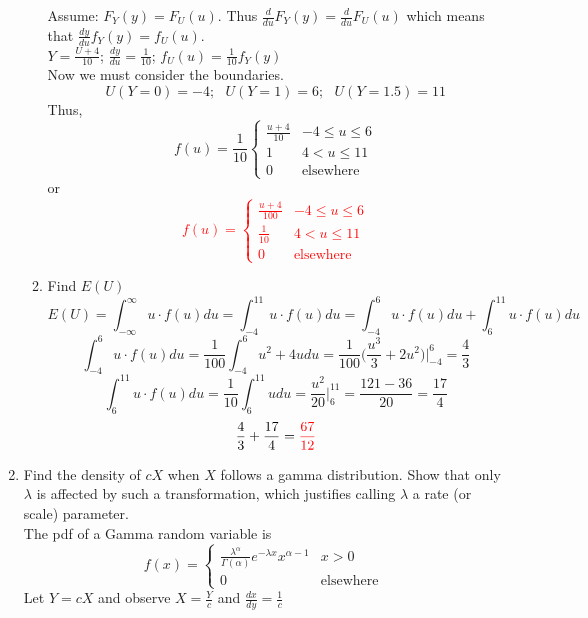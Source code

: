 \documentclass{article}
\begin{document}
\begin{enumerate}
\begin{enumerate}
        Assume: $F_Y(y)=F_U(u)$. Thus $\frac{d}{du}F_Y(y)=\frac{d}{du}F_U(u)$ which means that $\frac{dy}{du}f_Y(y)=f_U(u)$.\\
        $Y=\frac{U+4}{10}$; $\frac{dy}{du}= \frac{1}{10}$; $f_U(u)=\frac{1}{10}f_Y(y)$\\
        Now we must consider the boundaries.
        \[
            U(Y=0)=-4;\text{ } U(Y=1)=6;\text{ }U(Y=1.5)=11
        \]
        Thus,
        \[
        f(u)=\frac{1}{10}
        \begin{cases}
            \frac{u+4}{10} & -4 \leq u \leq 6 \\
            1 & 4 < u \leq 11 \\
            0 & \text{elsewhere}
        \end{cases}
        \]
        or \textcolor{red}{\[
        f(u)=
        \begin{cases}
            \frac{u+4}{100} & -4 \leq u \leq 6 \\
            \frac{1}{10} & 4 < u \leq 11 \\
            0 & \text{elsewhere}
        \end{cases}
        \]}
        \item Find $E(U)$
        \[
        E(U)=\int_{-\infty}^\infty u \cdot f(u)du = \int_{-4}^{11} u\cdot f(u)du=\int_{-4}^{6} u\cdot f(u)du+\int_{6}^{11} u\cdot f(u)du
        \]
        \[
            \int_{-4}^{6} u\cdot f(u)du = \frac{1}{100}\int_{-4}^{6}u^2+4udu=\frac{1}{100}\Big(\frac{u^3}{3}+2u^2\Big)\Bigg|_{-4}^6=\frac{4}{3}
        \]
        \[
            \int_{6}^{11} u\cdot f(u)du = \frac{1}{10}\int_{6}^{11} udu =\frac{u^2}{20}\Bigg|_6^{11}=\frac{121-36}{20}=\frac{17}{4}
        \]
        \[
        \frac{4}{3}+\frac{17}{4}=\textcolor{red}{\frac{67}{12}}
        \]
    \end{enumerate}
\pagebreak
    \item Find the density of $cX$ when $X$ follows a gamma distribution. Show that only $\lambda$ is affected by such a transformation, which justifies calling $\lambda$ a rate (or scale) parameter.\\
    The pdf of a Gamma random variable is
        \[
        f(x)=
        \begin{cases}
            \frac{\lambda^{\alpha}}{\Gamma(\alpha)}e^{-\lambda x}x^{\alpha-1} & x > 0 \\
            0 & \text{elsewhere}
        \end{cases}
    \]
    Let $Y=cX$ and observe $X=\frac{Y}{c}$ and $\frac{dx}{dy}=\frac{1}{c}$\\

\end{enumerate}
\end{document}
